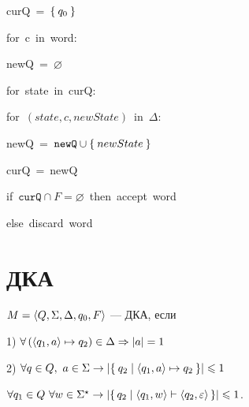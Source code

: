 \begin{lyxcode}
  curQ~=~$\Set{ q_{0}} $

  for~c~in~word:
	\begin{lyxcode}
	newQ~=~$\varnothing$

	for~state~in~curQ:
	  \begin{lyxcode}
	  for~$\left(state,c,newState\right)$~in~$\Delta$:
		\begin{lyxcode}
		  newQ~=~$\mathtt{newQ}\cup\Set{newState} $
		\end{lyxcode}
	  \end{lyxcode}
	curQ~=~newQ
	\end{lyxcode}
  if~$\mathtt{curQ} \cap F=\varnothing$~then~accept~word

  else~discard~word
\end{lyxcode}

\section{ДКА}
\begin{define*}
$M=\Braket{ Q,\Sigma,\Delta,q_{0},F} $ --- ДКА, если

1) $\forall\left(\Braket{ q_{1},a} \mapsto q_{2}\right)\in\Delta\Rightarrow\left\lvert a \right\rvert=1$

2) $\forall q\in Q,\ a\in\Sigma\rightarrow\abs{\Set{ q_{2}|\Braket{ q_{1},a} \mapsto q_{2}} }\le1$\end{define*}
\begin{claim*}
$\forall q_{1}\in Q\ \forall w\in\Sigma^{\star}\rightarrow\left\lvert \set{ q_{2}|\Braket{ q_{1},w} \vdash\Braket{ q_{2},\varepsilon} }  \right\rvert\leqslant1$.\end{claim*}



